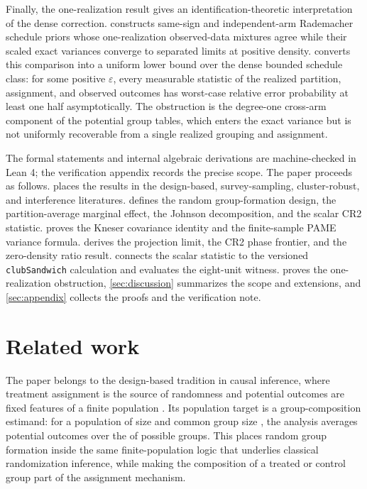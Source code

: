 \documentclass[11pt]{article}
\begin{document}
Finally, the one-realization result gives an identification-theoretic interpretation of the dense correction.  constructs same-sign and independent-arm Rademacher schedule priors whose one-realization observed-data mixtures agree while their scaled exact variances converge to separated limits at positive density.  converts this comparison into a uniform lower bound over the dense bounded schedule class: for some positive \(\varepsilon\), every measurable statistic of the realized partition, assignment, and observed outcomes has worst-case relative error probability at least one half asymptotically. The obstruction is the degree-one cross-arm component of the potential group tables, which enters the exact variance but is not uniformly recoverable from a single realized grouping and assignment.

The formal statements and internal algebraic derivations are machine-checked in Lean 4; the verification appendix records the precise scope. The paper proceeds as follows.  places the results in the design-based, survey-sampling, cluster-robust, and interference literatures.  defines the random group-formation design, the partition-average marginal effect, the Johnson decomposition, and the scalar CR2 statistic.  proves the Kneser covariance identity and the finite-sample PAME variance formula.  derives the projection limit, the CR2 phase frontier, and the zero-density ratio result.  connects the scalar statistic to the versioned \texttt{clubSandwich} calculation and evaluates the eight-unit witness.  proves the one-realization obstruction, \cref{sec:discussion} summarizes the scope and extensions, and \cref{sec:appendix} collects the proofs and the verification note.


\section{Related work}\label{sec:related-work}

The paper belongs to the design-based tradition in causal inference, where treatment assignment is the source of randomness and potential outcomes are fixed features of a finite population \citep{Neyman1923,Fisher1935,Cox1958,Rubin1974,Holland1986}. Its population target is a group-composition estimand: for a population of size  and common group size , the analysis averages potential outcomes over the  of possible groups. This places random group formation inside the same finite-population logic that underlies classical randomization inference, while making the composition of a treated or control group part of the assignment mechanism.
\end{document}
